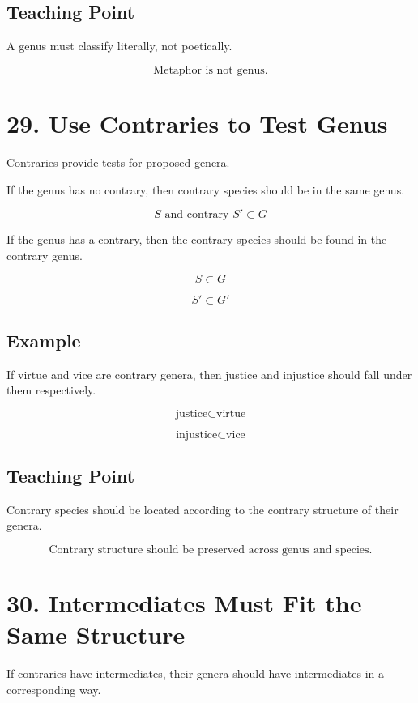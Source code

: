 \documentclass[12pt]{article}
\begin{document}
\subsection*{Teaching Point}

A genus must classify literally, not poetically.

\[
\boxed{
\text{Metaphor is not genus.}
}
\]

\section*{29. Use Contraries to Test Genus}

Contraries provide tests for proposed genera.

If the genus has no contrary, then contrary species should be in the same genus.

\[
S \text{ and contrary } S' \subset G
\]

If the genus has a contrary, then the contrary species should be found in the
contrary genus.

\[
S \subset G
\]

\[
S' \subset G'
\]

\subsection*{Example}

If virtue and vice are contrary genera, then justice and injustice should fall
under them respectively.

\[
\text{justice} \subset \text{virtue}
\]

\[
\text{injustice} \subset \text{vice}
\]

\subsection*{Teaching Point}

Contrary species should be located according to the contrary structure of their
genera.

\[
\boxed{
\text{Contrary structure should be preserved across genus and species.}
}
\]

\section*{30. Intermediates Must Fit the Same Structure}

If contraries have intermediates, their genera should have intermediates in a
corresponding way.
\end{document}
